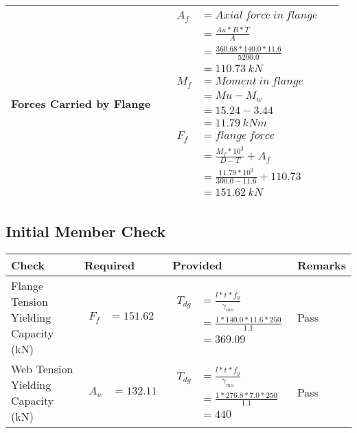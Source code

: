 \documentclass{article}%
\begin{document}
\begin{longtable}{|p{4cm}|p{3.5cm}|p{6.5cm}|p{1.5cm}|}
\hline%
Forces Carried by Flange&&$\begin{aligned} A_f&= Axial~force~ in ~flange  \\ &= \frac{Au * B *T}{A} \\ &= \frac{360.68 * 140.0*11.6}{5290.0} \\ &=110.73~ kN\\ M_f& =Moment~ in~ flange \\  & = Mu-M_w\\ &= 15.24-3.44\\ &=11.79~{kNm}\\  F_f& =flange~force  \\ & = \frac{M_f *10^3}{D-T} + A_f \\ &= \frac{11.79* 10^3}{300.0-11.6} +110.73 \\ &=151.62~kN \end{aligned}$&\\%
\hline%
\end{longtable}

%
\newpage%
\subsection{Initial Member Check}%
\label{subsec:InitialMemberCheck}%
\renewcommand{\arraystretch}{1.2}%
\begin{longtable}{|p{3cm}|p{4.5cm}|p{6.5cm}|p{1.5cm}|}%
\hline%
\rowcolor{OsdagGreen}%
Check&Required&Provided&Remarks\\%
\hline%
\endhead%
\hline%
Flange Tension Yielding Capacity (kN)&$\begin{aligned} F_f &=151.62\end{aligned}$&$\begin{aligned} T_{dg} &= \frac{l*t*f_y}{\gamma_{mo}}\\ &=\frac{1*140.0*11.6*250}{1.1}\\ &=369.09\end{aligned}$&Pass\\%
\hline%
Web Tension Yielding Capacity (kN)&$\begin{aligned} A_w &=132.11\end{aligned}$&$\begin{aligned} T_{dg} &= \frac{l*t*f_y}{\gamma_{mo}}\\ &=\frac{1*276.8*7.0*250}{1.1}\\ &=440\end{aligned}$&Pass\\%
\hline%
\end{longtable}
\end{document}
